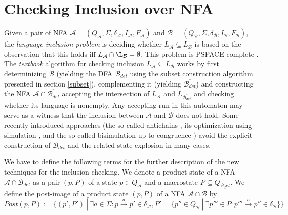 \chapter{Checking Inclusion over NFA}
\label{chapInclusion}
Given a pair of NFA $\mathcal{A}=(Q_\mathcal{A},\Sigma,\delta_\mathcal{A},I_\mathcal{A},F_\mathcal{A})$ 
and $\mathcal{B}=(Q_\mathcal{B},\Sigma,\delta_\mathcal{B},I_\mathcal{B},F_\mathcal{B})$, 
the \emph{language inclusion problem} is deciding whether $L_\mathcal{A} \subseteq L_\mathcal{B}$ is based on the observation that this holds iff 
$L_{\mathcal{A}}\cap\L_\mathcal{B}=\emptyset$.
This problem is PSPACE-complete \cite{cav06}. The \emph{textbook} algorithm for checking inclusion $L_\mathcal{A}\subseteq L_\mathcal{B}$ works by first 
determinizing $\mathcal{B}$ (yielding the DFA 
$\mathcal{B}_{det}$ using the subset construction algorithm presented in section \ref{subset}), 
complementing it (yielding $\overline{\mathcal{B}_{det}}$) and constructing the NFA $\mathcal{A} \cap \overline{\mathcal{B}_{det}}$ 
accepting the intersection of $L_{\mathcal{A}}$ and ${L_{\overline{\mathcal{B}_{det}}}}$ and
checking whether its language is nonempty. Any accepting run in this automaton may serve as a witness that the inclusion between $\mathcal{A}$ 
and $\mathcal{B}$ does not hold.
Some recently introduced approaches (the so-called antichains \cite{cav06}, its optimization using simulation \cite{tacas10}, and the so-called bisimulation up to
congruence \cite{popl13}) avoid the explicit construction of $\overline{\mathcal{B}_{det}}$ and the related state explosion in many cases.

We have to define the following terms for the further description of the new techniques for the inclusion checking.
We denote a product state of a NFA $\mathcal{A} \cap \mathcal{B}_{det}$ as a pair $(p,P)$ of a state $p\in Q_\mathcal{A}$ and a 
macrostate $P \subseteq Q_{\mathcal{B}_det}$.
We define the post-image of a product state $(p,P)$ of a NFA $\mathcal{A}\cap \mathcal{B}$ by
$Post(p,P):=\{(p',P')\ |\ \exists a \in \Sigma: p\xrightarrow{a} p' \in \delta_\mathcal{A}, P'=
\{p''\in Q_\mathcal{B}\ |\ \exists p''' \in P:p'''\xrightarrow{a} p''\in \delta_\mathcal{B}\}\}$

